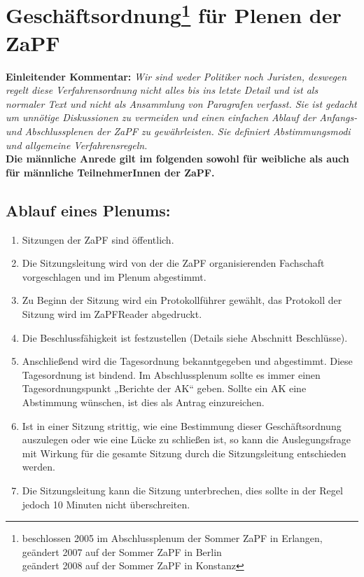 



\chapter*{Geschäftsordnung\footnote{beschlossen 2005 im Abschlussplenum der Sommer ZaPF in Erlangen,\\ geändert 2007 auf der Sommer ZaPF in Berlin\\geändert 2008 auf der Sommer ZaPF in Konstanz } für Plenen der ZaPF}

\textbf{Einleitender Kommentar:}
{\footnotesize\textit{
Wir sind weder Politiker noch Juristen, deswegen regelt diese Verfahrensordnung nicht alles bis ins
letzte Detail und ist als normaler Text und nicht als Ansammlung von Paragrafen verfasst. Sie ist
gedacht um unnötige Diskussionen zu vermeiden und einen einfachen Ablauf der Anfangs- und
Abschlussplenen der ZaPF zu gewährleisten. Sie definiert Abstimmungsmodi und allgemeine
Verfahrensregeln.}}\\[1ex]
\noindent \textbf{Die männliche Anrede gilt im folgenden sowohl für
weibliche als auch für männliche
 TeilnehmerInnen der ZaPF.}

\section{Ablauf eines Plenums:}
\begin{enumerate}

\item{Sitzungen der ZaPF sind öffentlich.}

\item{Die Sitzungsleitung wird von der die ZaPF organisierenden Fachschaft vorgeschlagen und im
Plenum abgestimmt.}

\item{Zu Beginn der Sitzung wird ein Protokollführer gewählt, das Protokoll der Sitzung wird im ZaPFReader
abgedruckt.}

\item{Die Beschlussfähigkeit ist festzustellen (Details siehe Abschnitt Beschlüsse).}

\item{Anschließend wird die Tagesordnung bekanntgegeben und abgestimmt. Diese Tagesordnung ist
bindend. Im Abschlussplenum sollte es immer einen Tagesordnungspunkt „Berichte der AK“ geben.
Sollte ein AK eine Abstimmung wünschen, ist dies als Antrag einzureichen.}

\item{ Ist in einer Sitzung strittig, wie eine Bestimmung dieser Geschäftsordnung auszulegen oder wie eine
Lücke zu schließen ist, so kann die Auslegungsfrage mit Wirkung für die gesamte Sitzung durch die
Sitzungsleitung entschieden werden.}

\item{Die Sitzungsleitung kann die Sitzung unterbrechen, dies sollte in der Regel jedoch 10 Minuten nicht
überschreiten.}
\end{enumerate}


